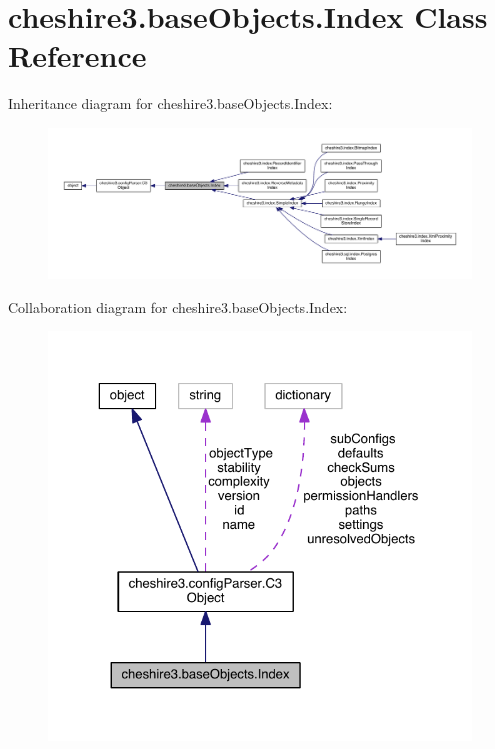 \hypertarget{classcheshire3_1_1base_objects_1_1_index}{\section{cheshire3.\-base\-Objects.\-Index Class Reference}
\label{classcheshire3_1_1base_objects_1_1_index}
}


Inheritance diagram for cheshire3.\-base\-Objects.\-Index\-:
\nopagebreak
\begin{figure}[H]
\begin{center}
\leavevmode
\includegraphics[width=350pt]{classcheshire3_1_1base_objects_1_1_index__inherit__graph}
\end{center}
\end{figure}


Collaboration diagram for cheshire3.\-base\-Objects.\-Index\-:
\nopagebreak
\begin{figure}[H]
\begin{center}
\leavevmode
\includegraphics[width=325pt]{classcheshire3_1_1base_objects_1_1_index__coll__graph}
\end{center}
\end{figure}
